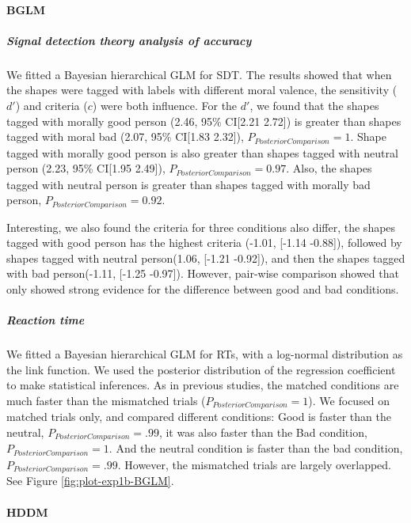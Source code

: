 \documentclass[
  english,
  man]{apa6}
\let\oldparagraph\paragraph
\renewcommand{\paragraph}[1]{\oldparagraph{#1}\mbox{}}
\let\oldsubparagraph\subparagraph
\renewcommand{\subparagraph}[1]{\oldsubparagraph{#1}\mbox{}}
\begin{document}
\hypertarget{bglm}{%
\paragraph{BGLM}\label{bglm}}

\hypertarget{signal-detection-theory-analysis-of-accuracy}{%
\subparagraph{Signal detection theory analysis of accuracy}\label{signal-detection-theory-analysis-of-accuracy}}

We fitted a Bayesian hierarchical GLM for SDT. The results showed that when the shapes were tagged with labels with different moral valence, the sensitivity (\(d'\)) and criteria (\(c\)) were both influence. For the \(d'\), we found that the shapes tagged with morally good person (2.46, 95\% CI{[}2.21 2.72{]}) is greater than shapes tagged with moral bad (2.07, 95\% CI{[}1.83 2.32{]}), \(P_{PosteriorComparison} = 1\). Shape tagged with morally good person is also greater than shapes tagged with neutral person (2.23, 95\% CI{[}1.95 2.49{]}), \(P_{PosteriorComparison} = 0.97\). Also, the shapes tagged with neutral person is greater than shapes tagged with morally bad person, \(P_{PosteriorComparison} = 0.92\).

Interesting, we also found the criteria for three conditions also differ, the shapes tagged with good person has the highest criteria (-1.01, {[}-1.14 -0.88{]}), followed by shapes tagged with neutral person(1.06, {[}-1.21 -0.92{]}), and then the shapes tagged with bad person(-1.11, {[}-1.25 -0.97{]}). However, pair-wise comparison showed that only showed strong evidence for the difference between good and bad conditions.

\hypertarget{reaction-time}{%
\subparagraph{Reaction time}\label{reaction-time}}

We fitted a Bayesian hierarchical GLM for RTs, with a log-normal distribution as the link function. We used the posterior distribution of the regression coefficient to make statistical inferences. As in previous studies, the matched conditions are much faster than the mismatched trials (\(P_{PosteriorComparison} = 1\)). We focused on matched trials only, and compared different conditions: Good is faster than the neutral, \(P_{PosteriorComparison} = .99\), it was also faster than the Bad condition, \(P_{PosteriorComparison} = 1\). And the neutral condition is faster than the bad condition, \(P_{PosteriorComparison} = .99\). However, the mismatched trials are largely overlapped. See Figure \ref{fig:plot-exp1b-BGLM}.

\hypertarget{hddm-1}{%
\paragraph{HDDM}\label{hddm-1}}
\end{document}
